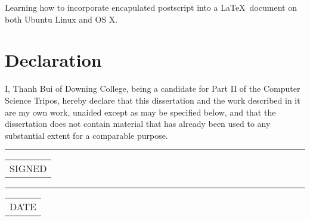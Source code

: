 Learning how to incorporate encapulated postscript into a \LaTeX\
document on both Ubuntu Linux and OS X.

\newpage
\section*{Declaration}

I, Thanh Bui of Downing College, being a candidate for Part II of the Computer
Science Tripos, hereby declare that this dissertation and the work described in it are my own work, unaided except as may be specified below, and that the dissertation
does not contain material that has already been used to any substantial extent for a comparable purpose.

	\begin{minipage}[t]{0.4\textwidth}
		\vspace*{1.5cm}  %
		\hrule
		\vspace{1mm} %
		\begin{tabular}[t]{l}
			SIGNED
		\end{tabular}
	\end{minipage} 
\hspace{2cm}
	\begin{minipage}[t]{0.4\textwidth}
		\vspace*{1.5cm}  %
		\hrule
		\vspace{1mm} %
		\begin{tabular}[t]{l}
			DATE
		\end{tabular}
	\end{minipage}